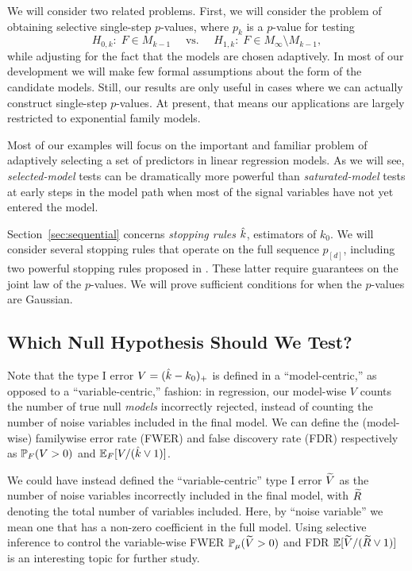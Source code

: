 \documentclass{article}
\begin{document}
We will consider two related problems. First, we will consider the problem of obtaining selective single-step $p$-values, where $p_k$ is a $p$-value for testing
\[
H_{0,k}:\; F\in M_{k-1}\quad \text{ vs. } \quad 
H_{1,k}:\; F\in M_\infty\setminus M_{k-1},
\]
while adjusting for the fact that the models are chosen adaptively. In most of our development we will make few formal assumptions about the form of the candidate models. Still, our results are only useful in cases where we can actually construct single-step $p$-values. At present, that means our applications are largely restricted to exponential family models.

Most of our examples will focus on the important and familiar problem of adaptively selecting a set of predictors in linear regression models. As we will see, {\em selected-model} tests can be dramatically more powerful than {\em saturated-model} tests at early steps in the model path when most of the signal variables have not yet entered the model.

Section~\ref{sec:sequential} concerns {\em stopping rules} $\hk$, estimators of $k_0$. We will consider several stopping rules that operate on the full sequence $p_{[d]}$, including two powerful stopping rules proposed in \citet{gsell2013sequential}. These latter require guarantees on the joint law of the $p$-values. We will prove sufficient conditions for when the $p$-values are Gaussian.

\subsection{Which Null Hypothesis Should We Test?}

Note that the type I error $V=(\hk-k_0)_+$ is defined in a ``model-centric,'' as opposed to a ``variable-centric,'' fashion: in regression, our model-wise $V$ counts the number of true null {\em models} incorrectly rejected, instead of counting the number of noise variables included in the final model. We can define the (model-wise) familywise error rate (FWER) and false discovery rate (FDR) respectively as $\P_F(V >0)$ and $\E_F[V/(\hk \vee 1)]$. 

We could have instead defined the ``variable-centric'' type I error $\tV$ as the number of noise variables incorrectly included in the final model, with $\tR$ denoting the total number of variables included. Here, by ``noise variable'' we mean one that has a non-zero coefficient in the full model. Using selective inference to control the variable-wise FWER $\P_\mu(\tV>0)$ and FDR $\E[\tV / (\tR \vee 1)]$ is an interesting topic for further study.
\end{document}
